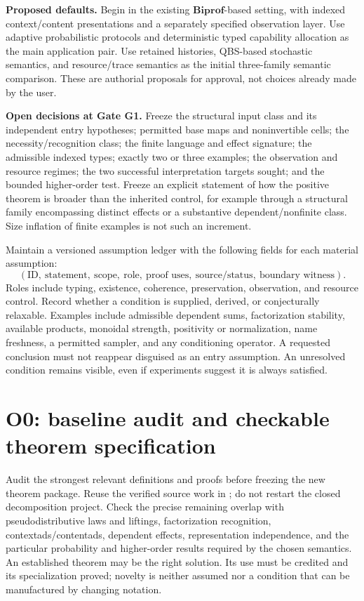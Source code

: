 \documentclass[11pt,a4paper]{article}
\newcommand{\Biprof}{\mathbf{Biprof}}
\begin{document}
\textbf{Proposed defaults.} Begin in the existing \(\Biprof\)-based setting,
with indexed context/content presentations and a separately specified
observation layer. Use adaptive probabilistic protocols and deterministic
typed capability allocation as the main application pair. Use retained
histories, QBS-based stochastic semantics, and resource/trace semantics as
the initial three-family semantic comparison. These are authorial proposals
for approval, not choices already made by the user.

\textbf{Open decisions at Gate G1.} Freeze the structural input class and
its independent entry hypotheses; permitted base maps and noninvertible
cells; the necessity/recognition class; the finite language and effect
signature; the admissible indexed types; exactly two or three examples;
the observation and resource regimes; the two successful interpretation
targets sought; and the bounded higher-order test. Freeze an explicit
statement of how the positive theorem is broader than the inherited control,
for example through a structural family encompassing distinct effects or a
substantive dependent/nonfinite class. Size inflation of finite examples is
not such an increment.

Maintain a versioned assumption ledger with the following fields for each
material assumption:
\[
 (\text{ID},\ \text{statement},\ \text{scope},\ \text{role},\
   \text{proof uses},\ \text{source/status},\ \text{boundary witness}).
\]
Roles include typing, existence, coherence, preservation, observation, and
resource control. Record whether a condition is supplied, derived, or
conjecturally relaxable. Examples include admissible dependent sums,
factorization stability, available products, monoidal strength, positivity or
normalization, name freshness, a permitted sampler, and any conditioning
operator. A requested conclusion must not reappear disguised as an entry
assumption. An unresolved condition remains visible, even if experiments
suggest it is always satisfied.

\section{O0: baseline audit and checkable theorem specification}\label{sec:o0}

Audit the strongest relevant definitions and proofs before freezing the new
theorem package. Reuse the verified source work in \cite{Audit,Unified}; do
not restart the closed decomposition project. Check the precise remaining
overlap with pseudodistributive laws and liftings, factorization recognition,
contextads/contentads, dependent effects, representation independence, and
the particular probability and higher-order results required by the chosen
semantics. An established theorem may be the right solution. Its use must be
credited and its specialization proved; novelty is neither assumed nor a
condition that can be manufactured by changing notation.
\end{document}
